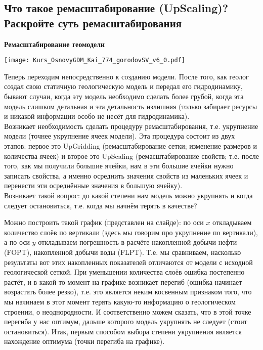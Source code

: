 

\subsection{Что такое ремасштабирование (UpScaling)? Раскройте суть ремасштабирования}

\textbf{Ремасштабирование геомодели}

\texttt{[image: Kurs\_OsnovyGDM\_Kai\_774\_gorodovSV\_v6\_0.pdf]}

Теперь переходим непосредственно к созданию модели.
После того, как геолог создал свою статичную геологическую модель и передал его гидродинамику, бывают случаи, когда эту модель необходимо сделать более грубой, когда эта модель слишком детальная и эта детальность излишняя (только забирает ресурсы и никакой информации особо не несёт для гидродинамика).
\\

Возникает необходимость сделать процедуру ремасштабирования, т.е. укрупнение модели (точнее укрупнение ячеек модели).
Эта процедура состоит из двух этапов: первое это UpGridding (ремасштабирование сетки; изменение размеров и количества ячеек) и второе это UpScaling (ремасштабирование свойств; т.е. после того, как мы получили большие ячейки, нам в эти большие ячейки нужно записать свойства, а именно осреднить значения свойств из маленьких ячеек и перенести эти осреднённые значения в большую ячейку).
\\

Возникает такой вопрос: до какой степени нам модель можно укрупнять и когда следует остановиться, т.е. когда мы начнём терять в качестве?

Можно построить такой график (представлен на слайде): по оси $x$ откладываем количество слоёв по вертикали (здесь мы говорим про укрупнение по вертикали), а по оси $y$ откладываем погрешность в расчёте накопленной добычи нефти (FOPT), накопленной добычи воды (FLPT).
Т.е. мы сравниваем, насколько результаты вот этих накопленных показателей отличаются от модели с исходной геологической сеткой.
При уменьшении количества слоёв ошибка постепенно растёт, и в какой-то момент на графике возникает перегиб (ошибка начинает возрастать более резко), т.е. это является неким косвенным признаком того, что мы начинаем в этот момент терять какую-то информацию о геологическом строении, о неоднородности.
И соответственно можем сказать, что в этой точке перегиба у нас оптимум, дальше которого модель укрупнять не следует (стоит остановиться).
Итак, первым способом выбора степени укрупнения является нахождение оптимума (точки перегиба на графике).

